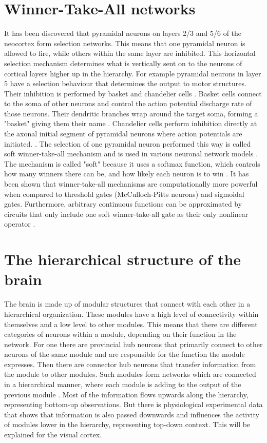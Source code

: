 \section{Winner-Take-All networks}

It has been discovered that pyramidal neurons on layers 2/3 and 5/6 of the neocortex form selection networks. This means that one pyramidal neuron is allowed to fire, while others within the same layer are inhibited. This horizontal selection mechanism determines what is vertically sent on to the neurons of cortical layers higher up in the hierarchy. For example pyramidal neurons in layer 5 have a selection behaviour that determines the output to motor structures. Their inhibition is performed by basket and chandelier cells \citep{softWTA}. Basket cells connect to the soma of other neurons and control the action potential discharge rate of those neurons. Their dendritic branches wrap around the target soma, forming a "basket" giving them their name \citep{basketCells}. Chandelier cells perform inhibition directly at the axonal initial segment of pyramidal neurons where action potentials are initiated. \citep{chandelierCells}. The selection of one pyramidal neuron performed this way is called soft winner-take-all mechanism and is used in various neuronal network models \citep{softWTA}. The mechanism is called "soft" because it uses a softmax function, which controls how many winners there can be, and how likely each neuron is to win \citep{handbookWTA}. It has been shown that winner-take-all mechanisms are computationally more powerful when compared to threshold gates (McCulloch-Pitts neurons) and sigmoidal gates. Furthermore, arbitrary continuous functions can be approximated by circuits that only include one soft winner-take-all gate as their only nonlinear operator \citep{WTAPower}.

\section{The hierarchical structure of the brain}

The brain is made up of modular structures that connect with each other in a hierarchical organization. These modules have a high level of connectivity within themselves and a low level to other modules. This means that there are different categories of neurons within a module, depending on their function in the network. For one there are provincial hub neurons that primarily connect to other neurons of the same module and are responsible for the function the module expresses. Then there are connector hub neurons that transfer information from the module to other modules. Such modules form networks which are connected in a hierarchical manner, where each module is adding to the output of the previous module \citep{hierarchicalBrain}.
Most of the information flows upwards along the hierarchy, representing bottom-up observations. But there is physiological experimental data that shows that information is also passed downwards and influences the activity of modules lower in the hierarchy, representing top-down context. This will be explained for the visual cortex.


